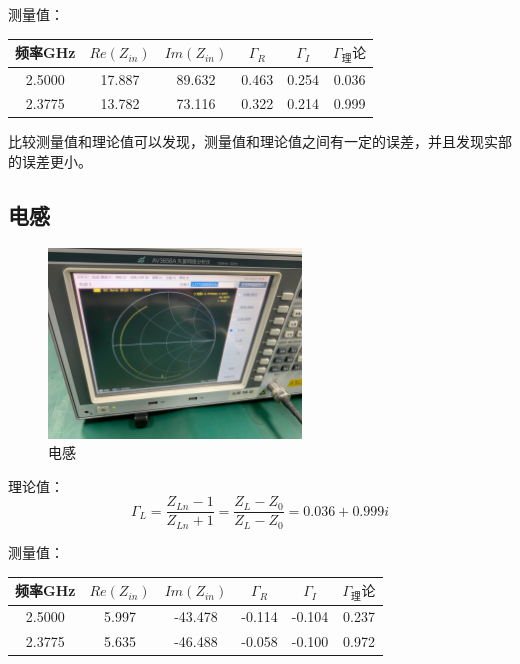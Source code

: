 \documentclass{../source/Experiment}
\begin{document}
            测量值：
            \begin{table}[H]
                \centering
                \begin{tabular}{|c|c|c|c|c|c|}
                \hline
                频率GHz  & $Re(Z_{in})$ & $Im(Z_{in})$ & $\Gamma _R$ & $\Gamma _I$ & $\Gamma _理论$ \\ \hline
                2.5000 & 17.887     & 89.632     & 0.463       & 0.254       & 0.036        \\ \hline
                2.3775 & 13.782     & 73.116     & 0.322       & 0.214       & 0.999        \\ \hline
                \end{tabular}
            \end{table}
            比较测量值和理论值可以发现，测量值和理论值之间有一定的误差，并且发现实部的误差更小。

        \subsection{电感}
            \begin{figure}[H]
                \centering
                \includegraphics[width = 0.6\textwidth]{pic/C2}
                \caption{电感}
            \end{figure}
            理论值：$$\Gamma _L = \frac{Z_{Ln}-1}{Z_{Ln}+1} = \frac{Z_L - Z_0}{Z_L - Z_0} = 0.036 +
            0.999i$$
            
            测量值：
            \begin{table}[H]
                \centering
                \begin{tabular}{|c|c|c|c|c|c|}
                \hline
                频率GHz  & $Re(Z_{in})$ & $Im(Z_{in})$ & $\Gamma _R$ & $\Gamma _I$ & $\Gamma _理论$ \\ \hline
                2.5000 & 5.997      & -43.478    & -0.114      & -0.104      & 0.237        \\ \hline
                2.3775 & 5.635      & -46.488    & -0.058      & -0.100      & 0.972        \\ \hline
                \end{tabular}
            \end{table}
\end{document}
